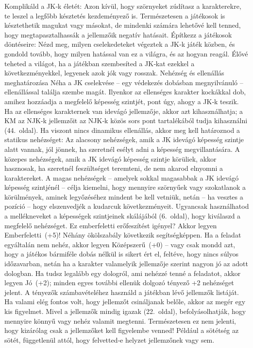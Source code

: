 \documentclass[oneside]{book}
\newcommand{\page}[1]{#1.~oldal}
\begin{document}
Komplikáld a JK‑k életét: Azon kívül, hogy szörnyeket zúdítasz a karakterekre, te leszel a legfőbb késztetés kezdeményező is. Természetesen a játékosok is késztethetik magukat vagy másokat, de mindenki számára lehetővé kell tenned, hogy megtapasztalhassák a jellemzőik negatív hatásait.
Építkezz a játékosok döntéseire: Nézd meg, milyen cselekedeteket végeztek a JK‑k játék közben, és gondold tovább, hogy milyen hatással van ez a világra, és az hogyan reagál. Élővé teheted a világot, ha a játékban szembesíted a JK‑kat ezekkel a következményekkel, legyenek azok jók vagy rosszak.
Nehézség és ellenállás meghatározása
Néha a JK cselekvése – egy védekezés dobásban megnyilvánuló – ellenállással találja szembe magát. Ilyenkor az ellenséges karakter kockákkal dob, amihez hozzáadja a megfelelő képesség szintjét, pont úgy, ahogy a JK‑k teszik. Ha az ellenséges karakternek van idevágó jellemzője, akkor azt kihasználhatja; a KM az NJK‑k jellemzőit az NJK‑k közös sors pont tartalékából tudja kihasználni (\page{44}).
Ha viszont nincs dinamikus ellenállás, akkor meg kell határoznod a statikus nehézséget:
Az alacsony nehézségek, amik a JK idevágó képesség szintje alatt vannak, jól jönnek, ha szeretnél esélyt adni a képesség megvillantására.
A közepes nehézségek, amik a JK idevágó képesség szintje körüliek, akkor hasznosak, ha szeretnél feszültséget teremteni, de nem akarod elnyomni a karaktereket.
A magas nehézségek – amelyek sokkal magasabbak a JK idevágó képesség szintjénél – célja kiemelni, hogy mennyire szörnyűek vagy szokatlanok a körülmények, aminek legyőzéséhez mindent be kell vetniük, netán – ha vesztes a pozíció – hogy elszenvedjék a kudarcuk következményeit.
Ugyancsak használhatod a mellékneveket a képességek szintjeinek skálájából (\page{6}), hogy kiválaszd a megfelelő nehézséget. Ez emberfeletti erőfeszítést igényel? Akkor legyen Emberfeletti~(+5)! Néhány ökölszabály következik segítségképpen.
Ha a feladat egyáltalán nem nehéz, akkor legyen Középszerű~(+0) – vagy csak mondd azt, hogy a játékos bármiféle dobás nélkül is sikert ért el, feltéve, hogy nincs súlyos időzavarban, netán ha a karakter valamelyik jellemzője szerint nagyon jó az adott dologban.
Ha tudsz legalább egy dologról, ami nehézzé tenné a feladatot, akkor legyen Jó~(+2); minden egyes további ellenük dolgozó tényező +2 nehézséget jelent.
A tényezők számbavételéhez használd a játékban lévő jellemzők listáját. Ha valami elég fontos volt, hogy jellemzőt csináljanak belőle, akkor az megér egy kis figyelmet. Mivel a jellemzők mindig igazak (\page{22}), befolyásolhatják, hogy mennyire könnyű vagy nehéz valamit megtenni. Természetesen ez nem jelenti, hogy kizárólag csak a jellemzőket kell figyelembe venned! Például a sötétség az sötét, függetlenül attól, hogy felvetted‑e helyzet jellemzőnek vagy sem.
\end{document}
